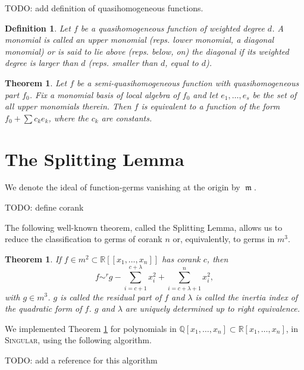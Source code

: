 \documentclass{amsproc}
\DeclareMathOperator{\m}{\mathfrak{m}}
\begin{document}
TODO: add definition of quasihomogeneous functions.

\newtheorem{UpperDiagonalMonomial}{Definition}
\begin{UpperDiagonalMonomial}\label{UpperDiagonalMonomial}
Let $f$ be a quasihomogeneous function of weighted degree $d$.
A monomial is called an upper monomial (reps. lower monomial, a diagonal
monomial) or is said to lie above (reps. below, on) the diagonal if its weighted degree is larger than $d$ (reps. smaller than $d$, equal to $d$).
\end{UpperDiagonalMonomial}
\newtheorem{SemiQuasiHomogeneousFunction}{Theorem}
\begin{SemiQuasiHomogeneousFunction}\label{SemiQuasiHomogeneousFunction}
Let $f$ be a semi-quasihomogeneous function with quasihomogeneous part $f_0$.
Fix a monomial basis of local algebra of $f_0$ and
let $e_1,\ldots, e_s$ be the set of all upper monomials therein.
Then $f$ is equivalent to a function of the form $f_0+\sum c_ke_k$, where the $c_k$ are constants.
\end{SemiQuasiHomogeneousFunction}
\section{The Splitting Lemma}
We denote the ideal of function-germs vanishing at the origin by $\m$.

TODO: define corank

The following well-known theorem, called the Splitting Lemma, allows us to reduce the classification to germs of corank $n$ or, equivalently, to germs in $m^3$.
\newtheorem{SplittingLemma}{Theorem}[section]
\newtheorem{AlgorithmSplittingLemma}[SplittingLemma]{Algorithm}
\begin{SplittingLemma}\label{SplittingLemma}
If $f\in m^2\subset \mathbb R[[x_1,\ldots,x_n]]$ has corank $c$, then
\[ f\sim^rg-\sum_{i=c+1}^{c+\lambda} x_i^2+\sum_{i=c+\lambda+1}^nx_i^2,\]
with $g\in m^3$. $g$ is called the residual part of $f$ and $\lambda$ is called
the inertia index of the quadratic form of $f$. $g$ and $\lambda$ are uniquely determined up to right equivalence.
\end{SplittingLemma}
We implemented Theorem \ref{SplittingLemma} for polynomials in $\mathbb
Q[x_1,\ldots,x_n]\subset\mathbb R[x_1,\ldots,x_n]$, in \textsc{Singular}, using the following algorithm.

TODO: add a reference for this algorithm
\end{document}
